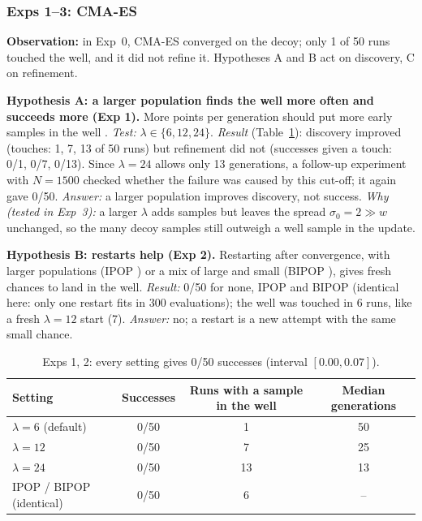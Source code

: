 \documentclass[10pt,a4paper]{article}
\begin{document}
\subsubsection{Exps 1--3: CMA-ES}
\textbf{Observation:} in Exp~0, CMA-ES converged on the decoy; only 1 of 50 runs touched the well, and it did not refine it. Hypotheses A and B act on discovery, C on refinement.

\textbf{Hypothesis A: a larger population finds the well more often and succeeds more (Exp 1).} More points per generation should put more early samples in the well \citep{hansen2016tutorial}. \emph{Test:} $\lambda\in\{6,12,24\}$. \emph{Result} (Table~\ref{tab:cma12}): discovery improved (touches: 1, 7, 13 of 50 runs) but refinement did not (successes given a touch: 0/1, 0/7, 0/13). Since $\lambda=24$ allows only 13 generations, a follow-up experiment with $N=1500$ checked whether the failure was caused by this cut-off; it again gave 0/50. \emph{Answer:} a larger population improves discovery, not success. \emph{Why (tested in Exp~3):} a larger $\lambda$ adds samples but leaves the spread $\sigma_0=2\gg w$ unchanged, so the many decoy samples still outweigh a well sample in the update.

\textbf{Hypothesis B: restarts help (Exp 2).} Restarting after convergence, with larger populations (IPOP \citep{auger2005ipop}) or a mix of large and small (BIPOP \citep{hansen2009bipop}), gives fresh chances to land in the well. \emph{Result:} 0/50 for none, IPOP and BIPOP (identical here: only one restart fits in 300 evaluations); the well was touched in 6 runs, like a fresh $\lambda=12$ start (7). \emph{Answer:} no; a restart is a new attempt with the same small chance.

\begin{table}[!ht]
\centering\footnotesize
\caption{Exps 1, 2: every setting gives 0/50 successes (interval $[0.00,0.07]$).}\label{tab:cma12}
\begin{tabular}{@{}lccc@{}}
\toprule
Setting & Successes & Runs with a sample in the well & Median generations \\
\midrule
$\lambda=6$ (default) & 0/50 & 1 & 50 \\
$\lambda=12$ & 0/50 & 7 & 25 \\
$\lambda=24$ & 0/50 & 13 & 13 \\
IPOP / BIPOP (identical) & 0/50 & 6 & -- \\
\bottomrule
\end{tabular}
\end{table}
\end{document}
